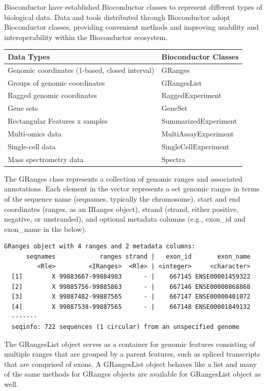 Bioconductor have established Bioconductor classes to represent different types of biological data. Data and tools distributed through Bioconductor adopt Bioconductor classes, providing convenient methods and improving usability and interoperability within the Bioconductor ecosystem.

\begin{tabular}[t]{ll}
\toprule
Data Types & Bioconductor Classes\\
\midrule
Genomic coordinates (1-based, closed interval) & GRanges\\
Groups of genomic coordinates & GRangesList\\
Ragged genomic coordinates & RaggedExperiment\\
Gene sets & GeneSet\\
Rectangular Features x samples & SummarizedExperiment\\
\addlinespace
Multi-omics data & MultiAssayExperiment\\
Single-cell data & SingleCellExperiment\\
Mass spectrometry data & Spectra\\
\bottomrule
\end{tabular}

The GRanges class represents a collection of genomic ranges and associated annotations. Each element in the vector represents a set genomic ranges in terms of the sequence name (seqnames, typically the chromosome), start and end coordinates (ranges, as an IRanges object), strand (strand, either positive, negative, or unstranded), and optional metadata columns (e.g., exon\_id and exon\_name in the below).

\begin{verbatim}
GRanges object with 4 ranges and 2 metadata columns:
      seqnames            ranges strand |   exon_id       exon_name
         <Rle>         <IRanges>  <Rle> | <integer>     <character>
  [1]        X 99883667-99884983      - |    667145 ENSE00001459322
  [2]        X 99885756-99885863      - |    667146 ENSE00000868868
  [3]        X 99887482-99887565      - |    667147 ENSE00000401072
  [4]        X 99887538-99887565      - |    667148 ENSE00001849132
  -------
  seqinfo: 722 sequences (1 circular) from an unspecified genome
\end{verbatim}

The GRangesList object serves as a container for genomic features consisting of multiple
ranges that are grouped by a parent features, such as spliced transcripts that are
comprised of exons. A GRangesList object behaves like a list and many of the same
methods for GRanges objects are available for GRangesList object as well.


